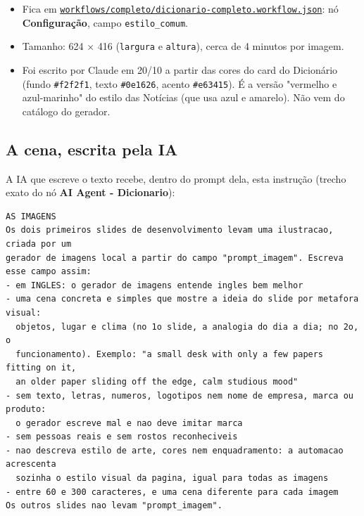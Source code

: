 \begin{itemize}
\item 
Fica em \href{run:../../../workflows/completo/dicionario-completo.workflow.json}{\nolinkurl{workflows/completo/dicionario-completo.workflow.json}}: nó \textbf{Configuração}, campo \nolinkurl{estilo_comum}.


\item 
Tamanho: 624 × 416 (\texttt{largura} e \texttt{altura}), cerca de 4 minutos por imagem.


\item 
Foi escrito por Claude em 20/10 a partir das cores do card do Dicionário (fundo \texttt{\#f2f2f1}, texto \texttt{\#0e1626}, acento \texttt{\#e63415}). É a versão "vermelho e azul-marinho" do estilo das Notícias (que usa azul e amarelo). Não vem do catálogo do gerador.


\end{itemize}

\subsection*{A cena, escrita pela IA}

A IA que escreve o texto recebe, dentro do prompt dela, esta instrução (trecho exato do nó \textbf{AI Agent - Dicionario}):

\begin{lstlisting}
AS IMAGENS
Os dois primeiros slides de desenvolvimento levam uma ilustracao, criada por um
gerador de imagens local a partir do campo "prompt_imagem". Escreva esse campo assim:
- em INGLES: o gerador de imagens entende ingles bem melhor
- uma cena concreta e simples que mostre a ideia do slide por metafora visual:
  objetos, lugar e clima (no 1o slide, a analogia do dia a dia; no 2o, o
  funcionamento). Exemplo: "a small desk with only a few papers fitting on it,
  an older paper sliding off the edge, calm studious mood"
- sem texto, letras, numeros, logotipos nem nome de empresa, marca ou produto:
  o gerador escreve mal e nao deve imitar marca
- sem pessoas reais e sem rostos reconheciveis
- nao descreva estilo de arte, cores nem enquadramento: a automacao acrescenta
  sozinha o estilo visual da pagina, igual para todas as imagens
- entre 60 e 300 caracteres, e uma cena diferente para cada imagem
Os outros slides nao levam "prompt_imagem".
\end{lstlisting}

